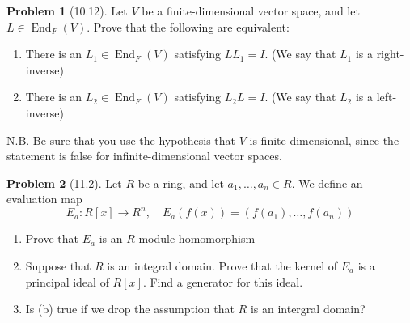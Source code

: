 \documentclass[12pt]{article}
\theoremstyle{definition}
\newtheorem{problem}{Problem}
\DeclareMathOperator{\End}{End}
\begin{document}
\begin{problem}[10.12]
    Let $V$ be a finite-dimensional vector space, and let $L \in \End_F(V)$. Prove that the following are equivalent:
    \begin{enumerate}[label=(\alph*)]
        \item There is an $L_1 \in \End_F(V)$ satisfying $LL_1 = I$. (We say that $L_1$ is a right-inverse)
        \item There is an $L_2 \in \End_F(V)$ satisfying $L_2L = I$. (We say that $L_2$ is a left-inverse)
    \end{enumerate}
    N.B. Be sure that you use the hypothesis that $V$ is finite dimensional, since the statement is false for infinite-dimensional vector spaces.
    
    \begin{solution}

    \end{solution}
\end{problem}

\begin{problem}[11.2]
    Let $R$ be a ring, and let $a_1, \ldots, a_n \in R$. We define an evaluation map
    \[
        E_a : R[x] \longrightarrow R^n, \quad E_a(f(x)) = (f(a_1), \ldots, f(a_n))
    \]
    \begin{enumerate}[label=(\alph*)]
        \item Prove that $E_a$ is an $R$-module homomorphism
        
        \begin{solution}

        \end{solution}

        \item Suppose that $R$ is an integral domain. Prove that the kernel of $E_a$ is a principal ideal of $R[x]$. Find a generator for this ideal.
        
        \begin{solution}

        \end{solution}

        \item Is (b) true if we drop the assumption that $R$ is an intergral domain?
        
        \begin{solution}

        \end{solution}
    \end{enumerate}
\end{problem}
\end{document}
